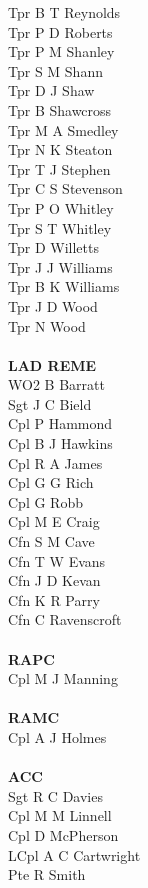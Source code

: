 \begin{multicols}{4}
  Tpr B T Reynolds \\
  Tpr P D Roberts \\
  Tpr P M Shanley \\
  Tpr S M Shann \\
  Tpr D J Shaw \\
  Tpr B Shawcross \\
  Tpr M A Smedley \\
  Tpr N K Steaton \\
  Tpr T J Stephen \\
  Tpr C S Stevenson \\
  Tpr P O Whitley \\
  Tpr S T Whitley \\
  Tpr D Willetts \\
  Tpr J J Williams \\
  Tpr B K Williams \\
  Tpr J D Wood \\
  Tpr N Wood \\
  \\
  \textbf{LAD REME} \\
  WO2 B Barratt \\
  Sgt J C Bield \\
  Cpl P Hammond \\
  Cpl B J Hawkins \\
  Cpl R A James \\
  Cpl G G Rich \\
  Cpl G Robb \\
  Cpl M E Craig \\
  Cfn S M Cave \\
  Cfn T W Evans \\
  Cfn J D Kevan \\
  Cfn K R Parry \\
  Cfn C Ravenscroft \\
  \\
  \textbf{RAPC} \\
  Cpl M J Manning \\
  \\
  \textbf{RAMC} \\
  Cpl A J Holmes \\
  \\
  \textbf{ACC} \\
  Sgt R C Davies \\
  Cpl M M Linnell \\
  Cpl D McPherson \\
  LCpl A C Cartwright \\
  Pte R Smith
\end{multicols}

\pagebreak
